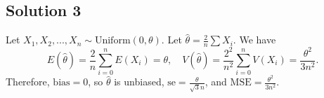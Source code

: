 \subsection*{Solution 3}

Let $X_1, X_2, ..., X_n \sim \mathrm{Uniform}(0, \theta)$.
Let $\hat{\theta} = \frac{2}{n} \sum X_i$.
We have
\begin{equation*}
    E(\hat{\theta}) = \frac{2}{n} \sum_{i=0}^n E(X_i)
        = \theta, \quad
    V(\hat{\theta}) = \frac{2^2}{n^2} \sum_{i = 0}^n V(X_i)
        = \frac{\theta^2}{3n^2}.
\end{equation*}
Therefore, $\mathrm{bias} = 0$, so $\hat{\theta}$ is unbiased, $\mathrm{se} = \frac{\theta}{\sqrt{3}n}$, and $\mathrm{MSE} = \frac{\theta^2}{3n^2}$.

